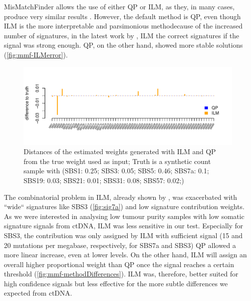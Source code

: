 MisMatchFinder allows the use of either QP or ILM, as they, in many cases, produce very similar results \cite{Lynch2016}. However, the default method is QP, even though ILM is the more interpretable and  parsimonious methodecause of the increased number of signatures, in the latest work by \textcite{Alexandrov2020}, ILM  the correct signatures if the signal was strong enough. QP, on the other hand, showed more stable solutions (\autoref{fig:mmf-ILMerror}).

\begin{figure}[!ht]
\centering
\includegraphics[width=.99\linewidth]{Figures/MisMatchFinder/lowInputSignalDeconv.pdf}
\caption[Distance of deconvolution methods from truth]{Distances of the estimated weights generated with ILM and QP from the true weight used as input; Truth is a synthetic count sample with (SBS1: 0.25; SBS3: 0.05; SBS5: 0.46; SBS7a: 0.1; SBS19: 0.03; SBS21: 0.01; SBS31: 0.08; SBS57: 0.02;)}\label{fig:mmf-ILMerror}
\end{figure}
 
The combinatorial problem in ILM, already shown by \textcite{Lynch2016}, was exacerbated  with ``wide`` signatures like SBS3 (\autoref{fig:sig7a}) and low signature contribution weights. As we were interested in analysing low tumour purity samples with low somatic signature signals from ctDNA, ILM was less sensitive in our test. Especially for SBS3, the  contribution was only assigned by ILM with sufficient signal (15 and 20 mutations per megabase, respectively, for SBS7a and SBS3) QP allowed a more linear  increase, even at lower levels. On the other hand, ILM will assign an overall higher proportional weight than QP once the signal reaches a certain threshold (\autoref{fig:mmf-methodDifferences}). ILM was, therefore, better suited for high confidence signals but less effective for the more subtle differences we expected from ctDNA.

